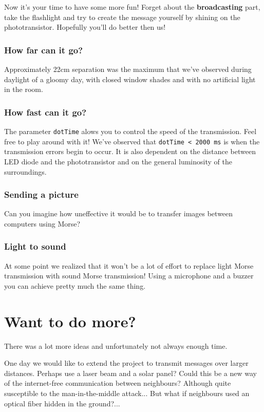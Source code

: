 \documentclass[12pt]{report}
\begin{document}
Now it's your time to have some more fun! Forget about the \textbf{broadcasting} part, take the flashlight and try to create the message yourself by shining on the phototransistor. Hopefully you'll do better then us!


\subsubsection{How far can it go?}

Approximately 22cm separation was the maximum that we've observed during daylight of a gloomy day, with closed window shades and with no artificial light in the room. 


\subsubsection{How fast can it go?}

The parameter \verb|dotTime| alows you to control the speed of the transmission. Feel free to play around with it! We've observed that \verb|dotTime < 2000 ms| is when the transmission errors begin to occur. It is also dependent on the distance between LED diode and the phototransistor and on the general luminosity of the surroundings.


\subsubsection{Sending a picture}

Can you imagine how uneffective it would be to transfer images between computers using Morse?

\subsubsection{Light to sound}

At some point we realized that it won't be a lot of effort to replace light Morse transmission with sound Morse transmission! Using a microphone and a buzzer you can achieve pretty much the same thing.

\section{Want to do more?}

There was a lot more ideas and unfortunately not always enough time.

One day we would like to extend the project to transmit messages over larger distances. Perhaps use a laser beam and a solar panel? Could this be a new way of the internet-free communication between neighbours? Although quite susceptible to the man-in-the-middle attack... But what if neighbours used an optical fiber hidden in the ground?...
\end{document}
